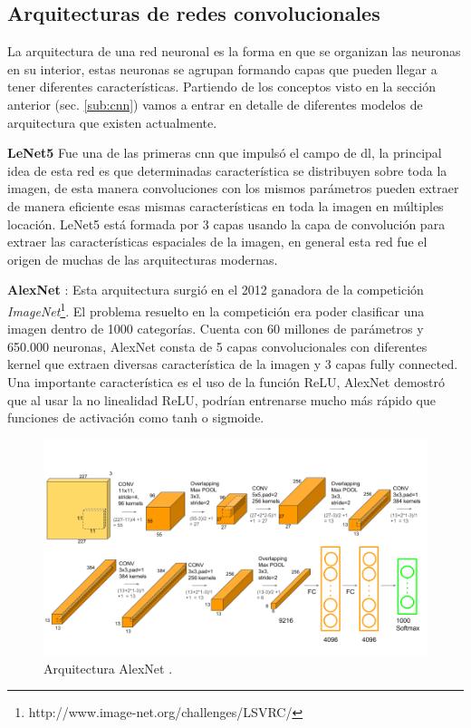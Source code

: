 \subsection{Arquitecturas de redes convolucionales}\label{sub:arquitecturacnn}
La arquitectura de una red neuronal es la forma en que se organizan  las neuronas en su interior, estas neuronas se agrupan formando capas que pueden llegar a tener diferentes características. Partiendo de los conceptos visto en la sección anterior (sec. \ref{sub:cnn})  vamos a entrar en detalle de diferentes modelos de arquitectura que existen actualmente.

\par \textbf{LeNet5} \citep{lenet} Fue una de las primeras \ac{cnn} que impulsó el campo de \ac{dl}, la principal idea de esta red es que determinadas característica se distribuyen sobre toda la imagen, de esta manera convoluciones con los mismos parámetros pueden extraer de manera eficiente esas mismas características en toda la imagen en múltiples locación. LeNet5 está formada por 3 capas usando la capa de convolución para extraer las características espaciales de la imagen, en general esta red fue el origen de muchas de las arquitecturas modernas.

\par \textbf{AlexNet} \citep{alexnet}: Esta arquitectura surgió en el 2012 ganadora de la competición \textit{ImageNet}\footnote{http://www.image-net.org/challenges/LSVRC/}. El problema resuelto en la competición era poder clasificar una imagen dentro de 1000 categorías. Cuenta con 60 millones de parámetros y 650.000 neuronas, AlexNet consta de 5 capas convolucionales con diferentes kernel que extraen diversas característica de la imagen  y 3 capas fully connected. Una importante característica es el uso de la función ReLU,  AlexNet demostró que al usar la no linealidad ReLU,  podrían entrenarse mucho más rápido que  funciones de activación como  tanh o sigmoide.

\begin{figure}[H]
 \centering
  \includegraphics[scale=0.4,keepaspectratio=true,clip=true]{imagenes/MarcoTeorico/AlexNet-1.png}
  \caption{Arquitectura AlexNet \citep{alexnet}.}
	\label{Fig:alexnet}
\end{figure}


